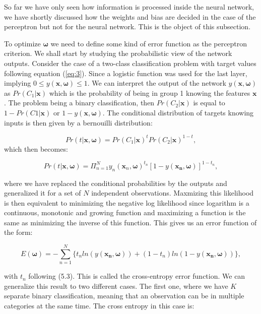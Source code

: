 \documentclass[a4paper,12pt]{article}
\numberwithin{equation}{section}
\begin{document}
So far we have only seen how information is processed inside the neural network, we have shortly discussed how the weights and bias are decided in the case of the perceptron but not for the neural network. This is the object of this subsection. 

To optimize $\boldsymbol{\omega}$ we need to define some kind of error function as the perceptron criterion. We shall start by studying the probabilistic view of the network outputs. Consider the case of a two-class classification problem with target values following equation (\ref{eq:3}). Since a logistic function was used for the last layer, implying $0\leq y(\boldsymbol{x},\boldsymbol{\omega}) \leq 1$. We can interpret the output of the network $y(\boldsymbol{x},\boldsymbol{\omega})$ as $Pr(C_1|\boldsymbol{x})$ which is the probability of being in group 1 knowing the features $\boldsymbol{x}$. The problem being a binary classification, then $Pr(C_2|\boldsymbol{x})$ is equal to $1- Pr(C1|\boldsymbol{x})$ or $1 - y(\boldsymbol{x},\boldsymbol{\omega})$.
The conditional distribution of targets knowing inputs is then given by a bernouilli distribution:

\begin{equation}\label{eq:8}
Pr(t|\boldsymbol{x},\boldsymbol{\omega}) = Pr(C_1|\boldsymbol{x})^{t}Pr(C_2|\boldsymbol{x})^{1-t},
\end{equation}
\noindent
which then becomes:

\begin{equation}\label{eq:9}
Pr(t|\boldsymbol{x},\boldsymbol{\omega}) = \Pi_{n=1}^Ny_n(\boldsymbol{x}_n,\boldsymbol{\omega})^{t_n}[1-y(\boldsymbol{x_n},\boldsymbol{\omega})]^{1-t_n},
\end{equation}

\noindent
where we have replaced the conditional probabilities by the outputs and generalized it for a set of $N$ independent observations. Maxmizing this likelihood is then equivalent to minimizing the negative log likelihood since logarithm is a continuous, monotonic and growing function and maximizing a function is the same as minimizing the inverse of this function. This gives us an error function of the form:

\begin{equation}\label{eq:10}
E(\boldsymbol{\omega}) = -\sum_{n=1}^{N} \{t_n ln ( y(\boldsymbol{x_n},\boldsymbol{\omega} ) )+(1-t_n) ln (1 - y(\boldsymbol{x_n},\boldsymbol{\omega}) ) \},
\end{equation}

with $t_n$ following (5.3). This is called the cross-entropy error function. We can generalize this result to two different cases. The first one, where we have $K$ separate binary classification, meaning that an observation can be in multiple categories at the same time. The cross entropy in this case is:
\end{document}
